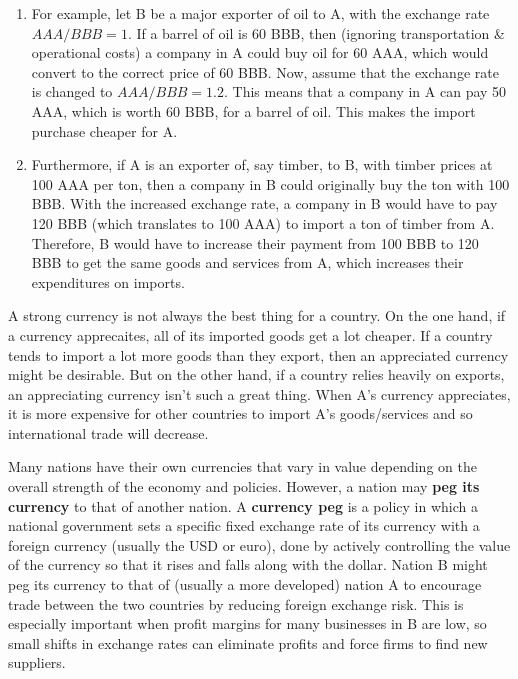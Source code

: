\documentclass{article}
\begin{document}
    \begin{enumerate}
      \item For example, let B be a major exporter of oil to A, with the exchange rate $AAA/BBB = 1$. If a barrel of oil is 60 BBB, then (ignoring transportation \& operational costs) a company in A could buy oil for 60 AAA, which would convert to the correct price of 60 BBB. Now, assume that the exchange rate is changed to $AAA/BBB = 1.2$. This means that a company in A can pay 50 AAA, which is worth 60 BBB, for a barrel of oil. This makes the import purchase cheaper for A.
      
      \begin{center}
      \end{center}

      \item Furthermore, if A is an exporter of, say timber, to B, with timber prices at 100 AAA per ton, then a company in B could originally buy the ton with 100 BBB. With the increased exchange rate, a company in B would have to pay 120 BBB (which translates to 100 AAA) to import a ton of timber from A. Therefore, B would have to increase their payment from 100 BBB to 120 BBB to get the same goods and services from A, which increases their expenditures on imports.

      \begin{center}
      \end{center}
    \end{enumerate}

    A strong currency is not always the best thing for a country. On the one hand, if a currency apprecaites, all of its imported goods get a lot cheaper. If a country tends to import a lot more goods than they export, then an appreciated currency might be desirable. But on the other hand, if a country relies heavily on exports, an appreciating currency isn't such a great thing. When A's currency appreciates, it is more expensive for other countries to import A's goods/services and so international trade will decrease.

    Many nations have their own currencies that vary in value depending on the overall strength of the economy and policies. However, a nation may \textbf{peg its currency} to that of another nation. A \textbf{currency peg} is a policy in which a national government sets a specific fixed exchange rate of its currency with a foreign currency (usually the USD or euro), done by actively controlling the value of the currency so that it rises and falls along with the dollar. Nation B might peg its currency to that of (usually a more developed) nation A to encourage trade between the two countries by reducing foreign exchange risk. This is especially important when profit margins for many businesses in B are low, so small shifts in exchange rates can eliminate profits and force firms to find new suppliers.
\end{document}
